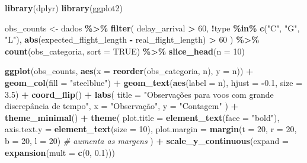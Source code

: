 \documentclass[
]{article}
\newenvironment{Shaded}{\begin{snugshade}}{\end{snugshade}}
\newcommand{\AttributeTok}[1]{\textcolor[rgb]{0.13,0.29,0.53}{#1}}
\newcommand{\CommentTok}[1]{\textcolor[rgb]{0.56,0.35,0.01}{\textit{#1}}}
\newcommand{\ConstantTok}[1]{\textcolor[rgb]{0.56,0.35,0.01}{#1}}
\newcommand{\DecValTok}[1]{\textcolor[rgb]{0.00,0.00,0.81}{#1}}
\newcommand{\FloatTok}[1]{\textcolor[rgb]{0.00,0.00,0.81}{#1}}
\newcommand{\FunctionTok}[1]{\textcolor[rgb]{0.13,0.29,0.53}{\textbf{#1}}}
\newcommand{\NormalTok}[1]{#1}
\newcommand{\OtherTok}[1]{\textcolor[rgb]{0.56,0.35,0.01}{#1}}
\newcommand{\SpecialCharTok}[1]{\textcolor[rgb]{0.81,0.36,0.00}{\textbf{#1}}}
\newcommand{\StringTok}[1]{\textcolor[rgb]{0.31,0.60,0.02}{#1}}
\begin{document}
\begin{Shaded}
\begin{Highlighting}[]
\FunctionTok{library}\NormalTok{(dplyr)}
\FunctionTok{library}\NormalTok{(ggplot2)}

\NormalTok{obs\_counts }\OtherTok{\textless{}{-}}\NormalTok{ dados }\SpecialCharTok{\%\textgreater{}\%}
  \FunctionTok{filter}\NormalTok{(}
\NormalTok{    delay\_arrival }\SpecialCharTok{\textgreater{}} \DecValTok{60}\NormalTok{,}
    \SpecialCharTok{!}\NormalTok{type }\SpecialCharTok{\%in\%} \FunctionTok{c}\NormalTok{(}\StringTok{"C"}\NormalTok{, }\StringTok{"G"}\NormalTok{, }\StringTok{"L"}\NormalTok{),}
    \FunctionTok{abs}\NormalTok{(expected\_flight\_length }\SpecialCharTok{{-}}\NormalTok{ real\_flight\_length) }\SpecialCharTok{\textgreater{}} \DecValTok{60}
\NormalTok{  ) }\SpecialCharTok{\%\textgreater{}\%}
  \FunctionTok{count}\NormalTok{(obs\_categoria, }\AttributeTok{sort =} \ConstantTok{TRUE}\NormalTok{) }\SpecialCharTok{\%\textgreater{}\%}
  \FunctionTok{slice\_head}\NormalTok{(}\AttributeTok{n =} \DecValTok{10}\NormalTok{)}

\FunctionTok{ggplot}\NormalTok{(obs\_counts, }\FunctionTok{aes}\NormalTok{(}\AttributeTok{x =} \FunctionTok{reorder}\NormalTok{(obs\_categoria, n), }\AttributeTok{y =}\NormalTok{ n)) }\SpecialCharTok{+}
  \FunctionTok{geom\_col}\NormalTok{(}\AttributeTok{fill =} \StringTok{"steelblue"}\NormalTok{) }\SpecialCharTok{+}
  \FunctionTok{geom\_text}\NormalTok{(}\FunctionTok{aes}\NormalTok{(}\AttributeTok{label =}\NormalTok{ n), }\AttributeTok{hjust =} \SpecialCharTok{{-}}\FloatTok{0.1}\NormalTok{, }\AttributeTok{size =} \FloatTok{3.5}\NormalTok{) }\SpecialCharTok{+}
  \FunctionTok{coord\_flip}\NormalTok{() }\SpecialCharTok{+}
  \FunctionTok{labs}\NormalTok{(}
    \AttributeTok{title =} \StringTok{"Observações para voos com grande discrepância de tempo"}\NormalTok{,}
    \AttributeTok{x =} \StringTok{"Observação"}\NormalTok{,}
    \AttributeTok{y =} \StringTok{"Contagem"}
\NormalTok{  ) }\SpecialCharTok{+}
  \FunctionTok{theme\_minimal}\NormalTok{() }\SpecialCharTok{+}
  \FunctionTok{theme}\NormalTok{(}
    \AttributeTok{plot.title =} \FunctionTok{element\_text}\NormalTok{(}\AttributeTok{face =} \StringTok{"bold"}\NormalTok{),}
    \AttributeTok{axis.text.y =} \FunctionTok{element\_text}\NormalTok{(}\AttributeTok{size =} \DecValTok{10}\NormalTok{),}
    \AttributeTok{plot.margin =} \FunctionTok{margin}\NormalTok{(}\AttributeTok{t =} \DecValTok{20}\NormalTok{, }\AttributeTok{r =} \DecValTok{20}\NormalTok{, }\AttributeTok{b =} \DecValTok{20}\NormalTok{, }\AttributeTok{l =} \DecValTok{20}\NormalTok{)  }\CommentTok{\# aumenta as margens}
\NormalTok{  ) }\SpecialCharTok{+}
  \FunctionTok{scale\_y\_continuous}\NormalTok{(}\AttributeTok{expand =} \FunctionTok{expansion}\NormalTok{(}\AttributeTok{mult =} \FunctionTok{c}\NormalTok{(}\DecValTok{0}\NormalTok{, }\FloatTok{0.1}\NormalTok{)))}
\end{Highlighting}
\end{Shaded}
\end{document}

